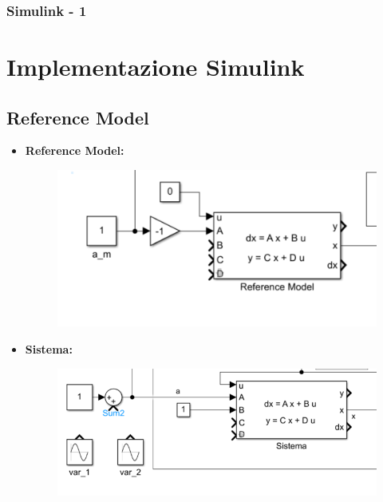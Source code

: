 \documentclass{beamer}
\begin{document}
\begin{frame}
	\frametitle{Simulink - 1}%
	\section{Implementazione Simulink}
	\subsection{Reference Model}
	\begin{minipage}[t]{0.45\textwidth}
		\begin{itemize}

			\item \textbf{Reference Model:}
			      \begin{figure}
				      \includegraphics[scale=0.4]{2022-05-19-18-26-28.png}%
			      \end{figure}
		\end{itemize}
	\end{minipage}
	\begin{minipage}[t]{0.45\textwidth}
		\begin{itemize}
			\item \textbf{Sistema:}
			      \begin{figure}
				      \includegraphics[scale=0.3]{2022-05-19-18-30-54.png}%
			      \end{figure}
		\end{itemize}
	\end{minipage}
\end{frame}
\end{document}
